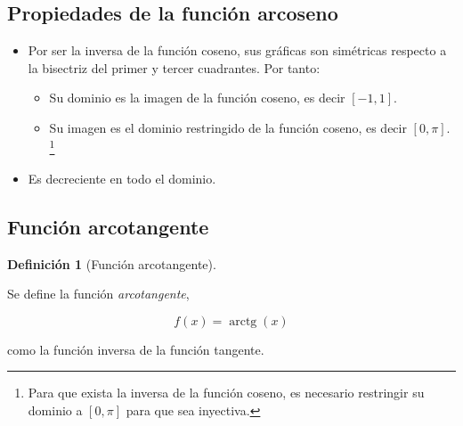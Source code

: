 \documentclass[
  a4paper,
]{scrreport}
\providecommand{\tightlist}{%
  \setlength{\itemsep}{0pt}\setlength{\parskip}{0pt}}\usepackage{longtable,booktabs,array}
\theoremstyle{definition}
\theoremstyle{plain}
\theoremstyle{definition}
\newtheorem{definition}{Definición}[chapter]
\theoremstyle{definition}
\theoremstyle{plain}
\theoremstyle{plain}
\theoremstyle{remark}
\begin{document}
\subsection{Propiedades de la función
arcoseno}\label{propiedades-de-la-funciuxf3n-arcoseno-1}

\begin{itemize}
\tightlist
\item
  Por ser la inversa de la función coseno, sus gráficas son simétricas
  respecto a la bisectriz del primer y tercer cuadrantes. Por tanto:

  \begin{itemize}
  \tightlist
  \item
    Su dominio es la imagen de la función coseno, es decir \([-1,1]\).
  \item
    Su imagen es el dominio restringido de la función coseno, es decir
    \([0,\pi]\). \footnote{Para que exista la inversa de la función
      coseno, es necesario restringir su dominio a \([0,\pi]\) para que
      sea inyectiva.}
  \end{itemize}
\item
  Es decreciente en todo el dominio.
\end{itemize}

\subsection{Función arcotangente}\label{funciuxf3n-arcotangente}

\begin{definition}[Función
arcotangente]\protect\hypertarget{def-funcion-arcotangente}{}\label{def-funcion-arcotangente}

Se define la función \emph{arcotangente},

\[f(x)=\operatorname{arctg}(x)\]

como la función inversa de la función tangente.

\end{definition}
\end{document}

